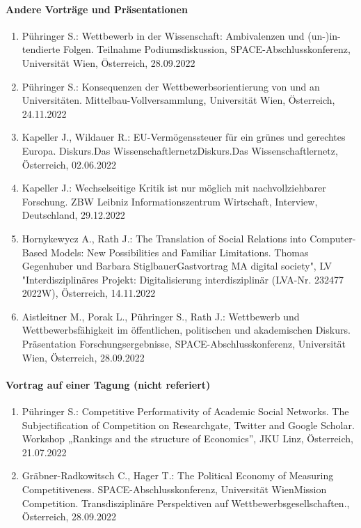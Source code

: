 \paragraph{Andere Vorträge und Präsentationen}
\begin{enumerate}
	\item Pühringer S.: Wettbewerb in der Wissenschaft: Ambivalenzen und (un-)in-tendierte Folgen. Teilnahme Podiumsdiskussion, SPACE-Abschlusskonferenz, Universität Wien, Österreich, 28.09.2022
	\item Pühringer S.: Konsequenzen der Wettbewerbsorientierung von und an Universitäten. Mittelbau-Vollversammlung, Universität Wien, Österreich, 24.11.2022
	\item Kapeller J., Wildauer R.: EU-Vermögenssteuer für ein grünes und gerechtes Europa. Diskurs.Das WissenschaftlernetzDiskurs.Das Wissenschaftlernetz, Österreich, 02.06.2022
	\item Kapeller J.: Wechselseitige Kritik ist nur möglich mit nachvollziehbarer Forschung. ZBW Leibniz Informationszentrum Wirtschaft, Interview, Deutschland, 29.12.2022
	\item Hornykewycz A., Rath J.: The Translation of Social Relations into Computer-Based Models: New Possibilities and Familiar Limitations. Thomas Gegenhuber und Barbara StiglbauerGastvortrag MA \glqq digital society", LV "Interdisziplinäres Projekt: Digitalisierung interdisziplinär\grqq{} (LVA-Nr. 232477 2022W), Österreich, 14.11.2022
	\item Aistleitner M., Porak L., Pühringer S., Rath J.: Wettbewerb und Wettbewerbsfähigkeit im öffentlichen, politischen und akademischen Diskurs. Präsentation Forschungsergebnisse, SPACE-Abschlusskonferenz, Universität Wien, Österreich, 28.09.2022
\end{enumerate}
\paragraph{Vortrag auf einer Tagung (nicht referiert)}
\begin{enumerate}
	\item Pühringer S.: Competitive Performativity of Academic Social Networks. The Subjectification of Competition on Researchgate, Twitter and Google Scholar. Workshop „Rankings and the structure of Economics”, JKU Linz, Österreich, 21.07.2022
	\item Gräbner-Radkowitsch C., Hager T.: The Political Economy of Measuring Competitiveness. SPACE-Abschlusskonferenz, Universität WienMission Competition. Transdisziplinäre Perspektiven auf Wettbewerbsgesellschaften., Österreich, 28.09.2022
\end{enumerate}

